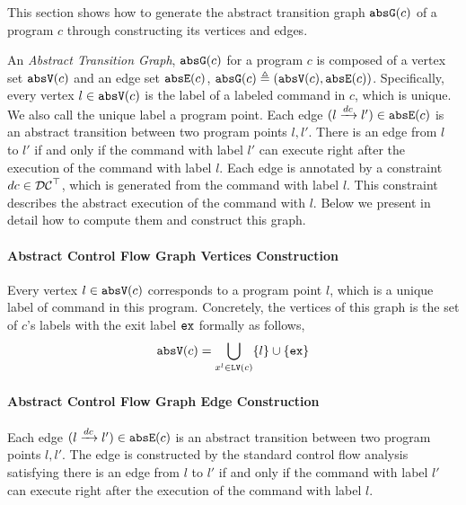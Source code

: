This section shows how to generate the abstract transition graph $\mathtt{abs}{\mathtt{G}}(c)$ of a
program $c$ through constructing its vertices and edges.

An \emph{Abstract Transition Graph}, $\mathtt{abs}{\mathtt{G}}(c)$ for a program $c$ is composed of
a vertex set $\mathtt{abs}{\mathtt{V}}(c)$ and an edge set $\mathtt{abs}{\mathtt{E}}(c)$, $\mathtt{abs}{\mathtt{G}}(c) \triangleq (\mathtt{abs}{\mathtt{V}}(c), \mathtt{abs}{\mathtt{E}}(c))$.
%
Specifically,
every 
vertex $l \in \mathtt{abs}{\mathtt{V}}(c)$ is the label of a labeled command in $c$, which is unique.
We also call the unique label a program point.
Each edge $(l \xrightarrow{dc} l') \in \mathtt{abs}{\mathtt{E}}(c)$ is an abstract transition
between two program points $l, l'$. 
There is an edge from $l$ to $l'$ if and only if
the command with label $l'$ can execute right after the execution of the command with label $l$.
Each edge is annotated by a constraint $dc \in \mathcal{DC}^{\top}$, which is generated from the command with label $l$.
This constraint describes the abstract execution of the command with $l$. 
Below we present in detail how to compute them and construct this graph.

\paragraph{Abstract Control Flow Graph Vertices Construction}
\label{sec:alg_abscfg-vertex}
Every 
vertex $l \in \mathtt{abs}{\mathtt{V}}(c)$ corresponds to a program point $l$, which is a unique
label of command in this program.
Concretely,
the vertices of this graph is the set of $c$'s labels with the exit label ${\mathtt{ex}}$ formally as follows,
\[ 
 \absV(c) = \bigcup\limits_{x^l \in \lvar(c) }\left\{ l \right\}\cup\{{\lex}\}
\]

\paragraph{Abstract Control Flow Graph Edge Construction}
\label{sec:alg_abscfg-edge}
Each edge $(l \xrightarrow{dc} l') \in \mathtt{abs}{\mathtt{E}}(c)$ is an abstract transition
between two program points $l, l'$. 
The edge is constructed by the standard control flow analysis satisfying
there is an edge from $l$ to $l'$ if and only if
the command with label $l'$ can execute right after the execution of the command with label $l$.

